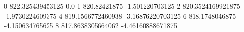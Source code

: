 0 822.325439453125 0.0
1 820.82421875 -1.501220703125
2 820.3524169921875 -1.9730224609375
4 819.1566772460938 -3.16876220703125
6 818.1748046875 -4.150634765625
8 817.8638305664062 -4.46160888671875
